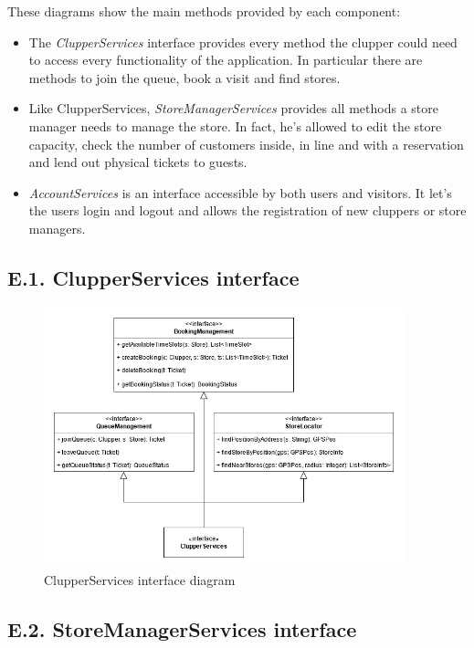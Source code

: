 These diagrams show the main methods provided by each component:
\begin{itemize}
\item
    The \emph{ClupperServices} interface provides every method the clupper could need to access every functionality of the application. In particular there are methods to join the queue, book a visit and find stores.
\item
    Like ClupperServices, \emph{StoreManagerServices} provides all methods a store manager needs to manage the store. In fact, he's allowed to edit the store capacity, check the number of customers inside, in line and with a reservation and lend out physical tickets to guests.
\item
    \emph{AccountServices} is an interface accessible by both users and visitors. It let's the users login and logout and allows the registration of new cluppers or store managers.
\end{itemize}

\subsection{E.1. ClupperServices interface}

\begin{figure}[H]
\centering
\includegraphics[width=0.93\textwidth]{component_interface_diagrams/clupper_component_interface_diagram}
\caption{ClupperServices interface diagram}
\end{figure}

\subsection{E.2. StoreManagerServices interface}

